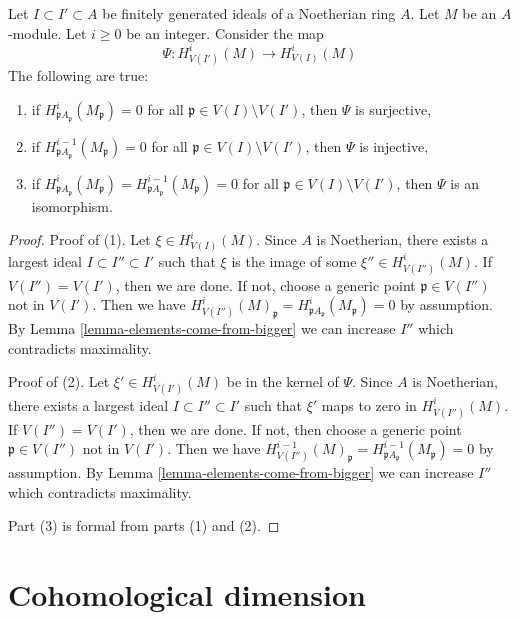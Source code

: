 \begin{lemma}
\label{lemma-isomorphism}
Let $I \subset I' \subset A$ be finitely generated ideals of a
Noetherian ring $A$. Let $M$ be an $A$-module. Let $i \geq 0$ be an integer.
Consider the map
$$
\Psi : H^i_{V(I')}(M) \to H^i_{V(I)}(M)
$$
The following are true:
\begin{enumerate}
\item if $H^i_{\mathfrak pA_\mathfrak p}(M_\mathfrak p) = 0$
for all $\mathfrak p \in V(I) \setminus V(I')$, then
$\Psi$ is surjective,
\item if $H^{i - 1}_{\mathfrak pA_\mathfrak p}(M_\mathfrak p) = 0$
for all $\mathfrak p \in V(I) \setminus V(I')$, then
$\Psi$ is injective,
\item if $H^i_{\mathfrak pA_\mathfrak p}(M_\mathfrak p) =
H^{i - 1}_{\mathfrak pA_\mathfrak p}(M_\mathfrak p) = 0$
for all $\mathfrak p \in V(I) \setminus V(I')$, then
$\Psi$ is an isomorphism.
\end{enumerate}
\end{lemma}

\begin{proof}
Proof of (1).
Let $\xi \in H^i_{V(I)}(M)$. Since $A$ is Noetherian, there exists a
largest ideal $I \subset I'' \subset I'$ such that $\xi$ is the image
of some $\xi'' \in H^i_{V(I'')}(M)$. If $V(I'') = V(I')$, then we are
done. If not, choose a generic point $\mathfrak p \in V(I'')$ not in $V(I')$.
Then we have $H^i_{V(I'')}(M)_\mathfrak p =
H^i_{\mathfrak pA_\mathfrak p}(M_\mathfrak p) = 0$ by assumption.
By Lemma \ref{lemma-elements-come-from-bigger} we can increase $I''$
which contradicts maximality.

\medskip\noindent
Proof of (2). Let $\xi' \in H^i_{V(I')}(M)$ be in the kernel of $\Psi$.
Since $A$ is Noetherian, there exists a
largest ideal $I \subset I'' \subset I'$ such that $\xi'$
maps to zero in $H^i_{V(I'')}(M)$. If $V(I'') = V(I')$, then we are
done. If not, then choose a generic point $\mathfrak p  \in V(I'')$
not in $V(I')$. Then we have $H^{i - 1}_{V(I'')}(M)_\mathfrak p =
H^{i - 1}_{\mathfrak pA_\mathfrak p}(M_\mathfrak p) = 0$ by assumption.
By Lemma \ref{lemma-elements-come-from-bigger} we can increase $I''$
which contradicts maximality.

\medskip\noindent
Part (3) is formal from parts (1) and (2).
\end{proof}








\section{Cohomological dimension}
\label{section-cd}

